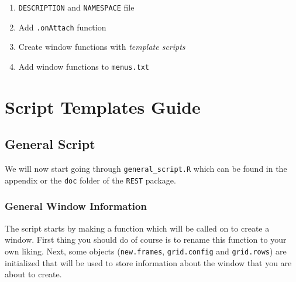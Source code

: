 \documentclass[a4paper]{article}\usepackage[]{graphicx}\usepackage[]{color}
\begin{document}
\begin{enumerate}
  \item \texttt{DESCRIPTION} and \texttt{NAMESPACE} file
  \item Add \texttt{.onAttach} function
  \item Create window functions with {\it template scripts}
  \item Add window functions to \texttt{menus.txt}
\end{enumerate}

\section{Script Templates Guide}

\subsection{General Script}
We will now start going through \texttt{general\_script.R} which can be found in
the appendix or the \verb|doc| folder of the \verb|REST| package.

\subsubsection{General Window Information}
\noindent The script starts by making a function which will be called on to
create a window. First thing you should do of course is to rename this function
to your own liking. Next, some objects (\verb|new.frames|, \verb|grid.config| and \verb|grid.rows|) are initialized that will be used to
store information about the window that you are about to create. 
\end{document}
